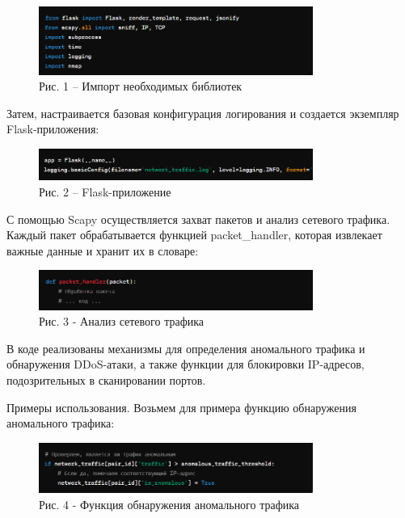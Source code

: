 \begin{figure}[H]
	\centering
	\includegraphics[width=0.8\textwidth]{assets/47}
	\caption*{Рис. 1 -- Импорт необходимых библиотек}
\end{figure}

Затем, настраивается базовая конфигурация логирования и создается
экземпляр Flask-приложения:

\begin{figure}[H]
	\centering
	\includegraphics[width=0.8\textwidth]{assets/48}
	\caption*{Рис. 2 -- Flask-приложение}
\end{figure}

С помощью Scapy осуществляется захват пакетов и анализ сетевого трафика.
Каждый пакет обрабатывается функцией packet\_handler, которая извлекает
важные данные и хранит их в словаре:

\begin{figure}[H]
	\centering
	\includegraphics[width=0.8\textwidth]{assets/49}
	\caption*{Рис. 3 - Анализ сетевого трафика}
\end{figure}

В коде реализованы механизмы для определения аномального трафика и
обнаружения DDoS-атаки, а также функции для блокировки IP-адресов,
подозрительных в сканировании портов.

Примеры использования. Возьмем для примера функцию обнаружения
аномального трафика:

\begin{figure}[H]
	\centering
	\includegraphics[width=0.8\textwidth]{assets/50}
	\caption*{Рис. 4 - Функция обнаружения аномального трафика}
\end{figure}


